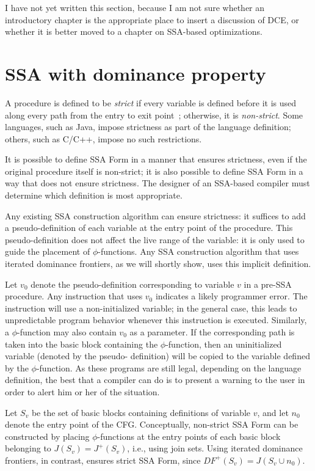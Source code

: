 I have not yet written this section, because I am not sure
whether an introductory chapter is the appropriate place
to insert a discussion of DCE, or whether it is better moved
to a chapter on SSA-based optimizations. 

\section{SSA with dominance property}

A procedure is defined to be \emph{strict} if every variable
is defined before it is used along every path from the entry
to exit point~\cite{BudimlicJun02}; otherwise, it is \emph{non-strict}. 
Some languages, such as Java, impose strictness as part of the language
definition; others, such as C/C++, impose no such restrictions. 

It is possible to define SSA Form in a manner that ensures strictness,
even if the original procedure itself is non-strict; it is also possible
to define SSA Form in a way that does not ensure strictness. The designer
of an SSA-based compiler must determine which definition is most appropriate.

Any existing SSA construction algorithm can ensure strictness: it suffices
to add a pseudo-definition of each variable at the entry point of the 
procedure. This pseudo-definition does not affect the live range of the
variable: it is only used to guide the placement of $\phi$-functions.
Any SSA construction algorithm that uses iterated dominance frontiers,
as we will shortly show, uses this implicit definition. 

Let $v_{0}$ denote the pseudo-definition corresponding to variable $v$ in
a pre-SSA procedure. Any instruction that uses $v_{0}$ indicates a likely
programmer error. The instruction will use a non-initialized variable; in
the general case, this leads to unpredictable program behavior whenever
this instruction is executed.
Similarly, a $\phi$-function may also contain $v_{0}$ as a parameter. 
If the corresponding path is taken into the basic block containing the
$\phi$-function, then an uninitialized variable (denoted by the pseudo-
definition) will be copied to the variable defined by the $\phi$-function.
As these programs are still legal, depending on the language definition,
the best that a compiler can do is to present a warning to the user in
order to alert him or her of the situation. 

Let $S_{v}$ be the set of basic blocks containing definitions of variable 
$v$, and let $n_{0}$ denote the entry point of the CFG. Conceptually, 
non-strict SSA Form can be constructed by placing $\phi$-functions at the
entry points of each basic block belonging to $J(S_{v}) = J^{+}(S_{v})$, 
i.e., using join sets. Using iterated dominance frontiers, in contrast, 
ensures strict SSA Form, since $DF^{+}(S_{v}) = J(S_{v} \cup n_{0})$.  

